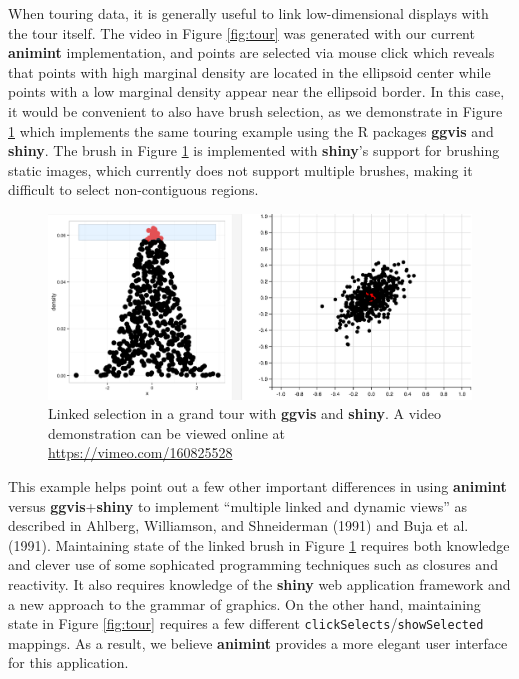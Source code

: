 \documentclass[12pt,]{article}
\theoremstyle{definition}
\theoremstyle{definition}
\theoremstyle{definition}
\theoremstyle{remark}
\begin{document}
When touring data, it is generally useful to link low-dimensional
displays with the tour itself. The video in Figure \ref{fig:tour} was
generated with our current \textbf{animint} implementation, and points
are selected via mouse click which reveals that points with high
marginal density are located in the ellipsoid center while points with a
low marginal density appear near the ellipsoid border. In this case, it
would be convenient to also have brush selection, as we demonstrate in
Figure \ref{fig:tourbrush} which implements the same touring example
using the R packages \textbf{ggvis} and \textbf{shiny}. The brush in
Figure \ref{fig:tourbrush} is implemented with \textbf{shiny}'s support
for brushing static images, which currently does not support multiple
brushes, making it difficult to select non-contiguous regions.

\begin{figure}
\centering
\includegraphics{images/tourbrush}
\caption{\label{fig:tourbrush}Linked selection in a grand tour with
\textbf{ggvis} and \textbf{shiny}. A video demonstration can be viewed
online at \url{https://vimeo.com/160825528}}
\end{figure}

This example helps point out a few other important differences in using
\textbf{animint} versus \textbf{ggvis}+\textbf{shiny} to implement
``multiple linked and dynamic views'' as described in Ahlberg,
Williamson, and Shneiderman (1991) and Buja et al. (1991). Maintaining
state of the linked brush in Figure \ref{fig:tourbrush} requires both
knowledge and clever use of some sophicated programming techniques such
as closures and reactivity. It also requires knowledge of the
\textbf{shiny} web application framework and a new approach to the
grammar of graphics. On the other hand, maintaining state in Figure
\ref{fig:tour} requires a few different
\texttt{clickSelects}/\texttt{showSelected} mappings. As a result, we
believe \textbf{animint} provides a more elegant user interface for this
application.
\end{document}
